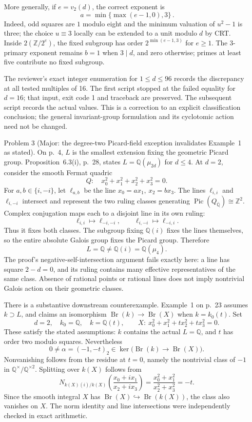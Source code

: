 \documentclass[10pt]{article}
\begin{document}
More generally, if \(e=v_2(d)\), the correct exponent is \[\boxed{\,a=\min\{\max(e-1,0),3\}\,}.\] Indeed, odd squares are \(1\) modulo eight and the minimum valuation of \(u^2-1\) is three; the choice \(u\equiv3\) locally can be extended to a unit modulo \(d\) by CRT. Inside \(2(\mathbb{Z}/2^e)\), the fixed subgroup has order \(2^{\min(e-1,3)}\) for \(e\ge1\). The \(3\)-primary exponent remains \(b=1\) when \(3\mid d\), and zero otherwise; primes at least five contribute no fixed subgroup.\par
The reviewer’s exact integer enumeration for \(1\le d\le96\) records the discrepancy at all tested multiples of 16. The first script stopped at the failed equality for \(d=16\); that input, exit code 1 and traceback are preserved. The subsequent script records the actual values. This is a correction to an explicit classification conclusion; the general invariant-group formulation and its cyclotomic action need not be changed.\par
Problem 3 (Major: the degree-two Picard-field exception invalidates Example 1 as stated).  On p. 4, \(L\) is the smallest extension fixing the geometric Picard group. Proposition 6.3(i), p. 28, states \(L=\mathbb{Q}(\mu_{2d})\) for \(d\le4\). At \(d=2\), consider the smooth Fermat quadric \[Q:\quad x_0^2+x_1^2+x_2^2+x_3^2=0.\] For \(a,b\in\{i,-i\}\), let \(\ell_{a,b}\) be the line \(x_0=ax_1,\ x_2=bx_3\). The lines \(\ell_{i,i}\) and \(\ell_{i,-i}\) intersect and represent the two ruling classes generating \(\mathop{\mathrm{Pic}}(Q_{\bar{\mathbb{Q}}})\cong\mathbb{Z}^2\). Complex conjugation maps each to a disjoint line in its own ruling: \[\ell_{i,i}\mapsto\ell_{-i,-i},\qquad
 \ell_{i,-i}\mapsto\ell_{-i,i}.\] Thus it fixes both classes. The subgroup fixing \(\mathbb{Q}(i)\) fixes the lines themselves, so the entire absolute Galois group fixes the Picard group. Therefore \[L=\mathbb{Q}\ne\mathbb{Q}(i)=\mathbb{Q}(\mu_4).\] The proof’s negative-self-intersection argument fails exactly here: a line has square \(2-d=0\), and its ruling contains many effective representatives of the same class. Absence of rational points or rational lines does not imply nontrivial Galois action on their geometric classes.\par
There is a substantive downstream counterexample. Example 1 on p. 23 assumes \(k\supset L\), and claims an isomorphism \(\mathop{\mathrm{Br}}(k)\to\mathop{\mathrm{Br}}(X)\) when \(k=k_0(t)\). Set \[d=2,\quad k_0=\mathbb{Q},\quad k=\mathbb{Q}(t),\qquad
 X:\ x_0^2+x_1^2+t x_2^2+t x_3^2=0.\] These satisfy the stated assumptions: \(k\) contains the actual \(L=\mathbb{Q}\), and \(t\) has order two modulo squares. Nevertheless \[0\ne\alpha=(-1,-t)_2\in
       \ker\bigl(\mathop{\mathrm{Br}}(k)\longrightarrow\mathop{\mathrm{Br}}(X)\bigr).\] Nonvanishing follows from the residue at \(t=0\), namely the nontrivial class of \(-1\) in \(\mathbb{Q}^\times/\mathbb{Q}^{\times2}\). Splitting over \(k(X)\) follows from \[N_{k(X)(i)/k(X)}
 \left(\frac{x_0+i x_1}{x_2+i x_3}\right)
 =\frac{x_0^2+x_1^2}{x_2^2+x_3^2}=-t.\] Since the smooth integral \(X\) has \(\mathop{\mathrm{Br}}(X)\hookrightarrow\mathop{\mathrm{Br}}(k(X))\), the class also vanishes on \(X\). The norm identity and line intersections were independently checked in exact arithmetic.\par
\end{document}

